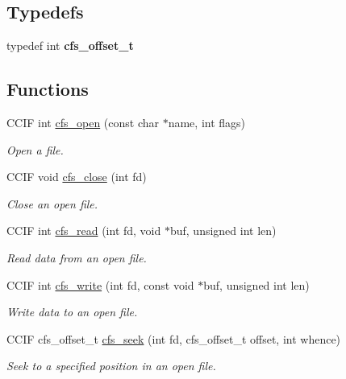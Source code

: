 \subsection*{Typedefs}
\begin{DoxyCompactItemize}
\item 
\hypertarget{group__cfs_gaceb17efc19e2857ee8dca0a729365213}{}typedef int {\bfseries cfs\+\_\+offset\+\_\+t}\label{group__cfs_gaceb17efc19e2857ee8dca0a729365213}

\end{DoxyCompactItemize}
\subsection*{Functions}
\begin{DoxyCompactItemize}
\item 
C\+C\+I\+F int \hyperlink{group__cfs_gadc1727a1a27a40a8483135425a42c5de}{cfs\+\_\+open} (const char $\ast$name, int flags)
\begin{DoxyCompactList}\small\item\em Open a file. \end{DoxyCompactList}\item 
C\+C\+I\+F void \hyperlink{group__cfs_gadc3991eb5ac0e1cb6fd5e162049785b4}{cfs\+\_\+close} (int fd)
\begin{DoxyCompactList}\small\item\em Close an open file. \end{DoxyCompactList}\item 
C\+C\+I\+F int \hyperlink{group__cfs_ga7bc4a520b99285c46ffb0f80dbe78ca1}{cfs\+\_\+read} (int fd, void $\ast$buf, unsigned int len)
\begin{DoxyCompactList}\small\item\em Read data from an open file. \end{DoxyCompactList}\item 
C\+C\+I\+F int \hyperlink{group__cfs_ga0c8cd2e553c7c2cfbe2ffb0fbc874fb7}{cfs\+\_\+write} (int fd, const void $\ast$buf, unsigned int len)
\begin{DoxyCompactList}\small\item\em Write data to an open file. \end{DoxyCompactList}\item 
C\+C\+I\+F cfs\+\_\+offset\+\_\+t \hyperlink{group__cfs_ga116cdc7036a99707477b50bd496fa1c1}{cfs\+\_\+seek} (int fd, cfs\+\_\+offset\+\_\+t offset, int whence)
\begin{DoxyCompactList}\small\item\em Seek to a specified position in an open file. \end{DoxyCompactList}\item 

\end{DoxyCompactItemize}
